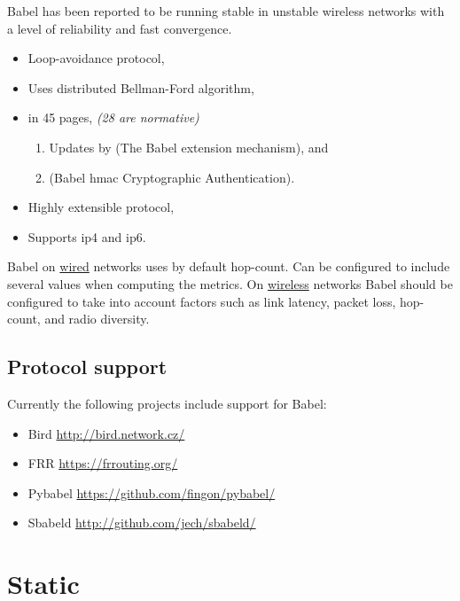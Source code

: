 Babel has been reported to be running stable in unstable wireless networks with
a level of reliability and fast convergence.

\begin{itemize}
    \item Loop-avoidance protocol,
    \item Uses distributed Bellman-Ford algorithm,
    \item {} in 45 pages, \textit{(28 are normative)}
    \begin{enumerate}
        \item Updates by  {\scriptsize (The Babel extension
        mechanism)}, and
        \item {} {\scriptsize (Babel \gls{hmac} Cryptographic
        Authentication)}.
    \end{enumerate}
    \item Highly extensible protocol,\cite{BabelDoe86:online}
    \item Supports \gls{ip4} and \gls{ip6}.
\end{itemize}

Babel on \underline{wired} networks uses by default hop-count. Can be
configured to include several values when computing the metrics.
On \underline{wireless} networks Babel should be configured to take into
account factors such as link latency, packet loss, hop-count, and radio
diversity.

\subsection{Protocol support}

Currently the following projects include support for Babel:
\cite{Babel-al30:online}

\begin{itemize}
    \item Bird {\footnotesize \url{http://bird.network.cz/}}
    \item FRR {\footnotesize \url{https://frrouting.org/}}
    \item Pybabel {\footnotesize \url{https://github.com/fingon/pybabel/}}
    \item Sbabeld {\footnotesize \url{http://github.com/jech/sbabeld/}}
\end{itemize}

\newpage

\section{Static}

